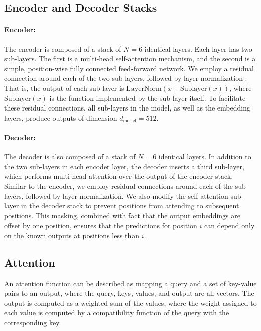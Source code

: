 \documentclass{article}
\newcommand{\dmodel}{d_{\text{model}}}
\begin{document}
\subsection{Encoder and Decoder Stacks}

\paragraph{Encoder:}The encoder is composed of a stack of $N=6$ identical layers. Each layer has two sub-layers. The first is a multi-head self-attention mechanism, and the second is a simple, position-wise fully connected feed-forward network.   We employ a residual connection \citep{he2016deep} around each of the two sub-layers, followed by layer normalization \cite{layernorm2016}.  That is, the output of each sub-layer is $\mathrm{LayerNorm}(x + \mathrm{Sublayer}(x))$, where $\mathrm{Sublayer}(x)$ is the function implemented by the sub-layer itself.  To facilitate these residual connections, all sub-layers in the model, as well as the embedding layers, produce outputs of dimension $\dmodel=512$.

\paragraph{Decoder:}The decoder is also composed of a stack of $N=6$ identical layers.  In addition to the two sub-layers in each encoder layer, the decoder inserts a third sub-layer, which performs multi-head attention over the output of the encoder stack.  Similar to the encoder, we employ residual connections around each of the sub-layers, followed by layer normalization.  We also modify the self-attention sub-layer in the decoder stack to prevent positions from attending to subsequent positions.  This masking, combined with fact that the output embeddings are offset by one position, ensures that the predictions for position $i$ can depend only on the known outputs at positions less than $i$.

\subsection{Attention} \label{sec:attention}
An attention function can be described as mapping a query and a set of key-value pairs to an output, where the query, keys, values, and output are all vectors.  The output is computed as a weighted sum of the values, where the weight assigned to each value is computed by a compatibility function of the query with the corresponding key.
\end{document}
